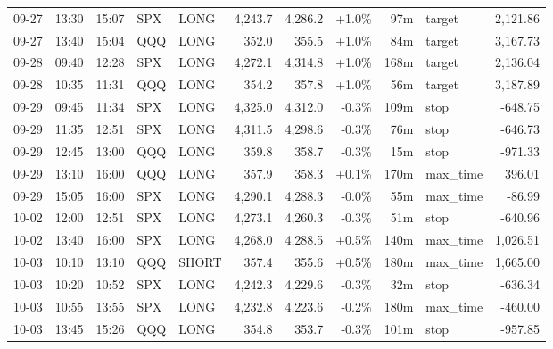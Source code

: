 \documentclass[11pt,a4paper,twoside]{article}
\begin{document}
\begin{center}
\begin{longtable}{>{\color{txtmain}}l l l l l r r r r >{\color{txtmain}}l r}
09-27 & 13:30 & 15:07 & SPX & LONG & 4,243.7 & 4,286.2 & \textcolor{wingreen}{+1.0\%} & 97m & target & \textcolor{wingreen}{2,121.86} \\
09-27 & 13:40 & 15:04 & QQQ & LONG & 352.0 & 355.5 & \textcolor{wingreen}{+1.0\%} & 84m & target & \textcolor{wingreen}{3,167.73} \\
09-28 & 09:40 & 12:28 & SPX & LONG & 4,272.1 & 4,314.8 & \textcolor{wingreen}{+1.0\%} & 168m & target & \textcolor{wingreen}{2,136.04} \\
09-28 & 10:35 & 11:31 & QQQ & LONG & 354.2 & 357.8 & \textcolor{wingreen}{+1.0\%} & 56m & target & \textcolor{wingreen}{3,187.89} \\
09-29 & 09:45 & 11:34 & SPX & LONG & 4,325.0 & 4,312.0 & \textcolor{lossred}{-0.3\%} & 109m & stop & \textcolor{lossred}{-648.75} \\
09-29 & 11:35 & 12:51 & SPX & LONG & 4,311.5 & 4,298.6 & \textcolor{lossred}{-0.3\%} & 76m & stop & \textcolor{lossred}{-646.73} \\
09-29 & 12:45 & 13:00 & QQQ & LONG & 359.8 & 358.7 & \textcolor{lossred}{-0.3\%} & 15m & stop & \textcolor{lossred}{-971.33} \\
09-29 & 13:10 & 16:00 & QQQ & LONG & 357.9 & 358.3 & \textcolor{wingreen}{+0.1\%} & 170m & max\_time & \textcolor{wingreen}{396.01} \\
09-29 & 15:05 & 16:00 & SPX & LONG & 4,290.1 & 4,288.3 & \textcolor{lossred}{-0.0\%} & 55m & max\_time & \textcolor{lossred}{-86.99} \\
10-02 & 12:00 & 12:51 & SPX & LONG & 4,273.1 & 4,260.3 & \textcolor{lossred}{-0.3\%} & 51m & stop & \textcolor{lossred}{-640.96} \\
10-02 & 13:40 & 16:00 & SPX & LONG & 4,268.0 & 4,288.5 & \textcolor{wingreen}{+0.5\%} & 140m & max\_time & \textcolor{wingreen}{1,026.51} \\
10-03 & 10:10 & 13:10 & QQQ & SHORT & 357.4 & 355.6 & \textcolor{wingreen}{+0.5\%} & 180m & max\_time & \textcolor{wingreen}{1,665.00} \\
10-03 & 10:20 & 10:52 & SPX & LONG & 4,242.3 & 4,229.6 & \textcolor{lossred}{-0.3\%} & 32m & stop & \textcolor{lossred}{-636.34} \\
10-03 & 10:55 & 13:55 & SPX & LONG & 4,232.8 & 4,223.6 & \textcolor{lossred}{-0.2\%} & 180m & max\_time & \textcolor{lossred}{-460.00} \\
10-03 & 13:45 & 15:26 & QQQ & LONG & 354.8 & 353.7 & \textcolor{lossred}{-0.3\%} & 101m & stop & \textcolor{lossred}{-957.85} \\

\end{longtable}
\end{center}
\end{document}
